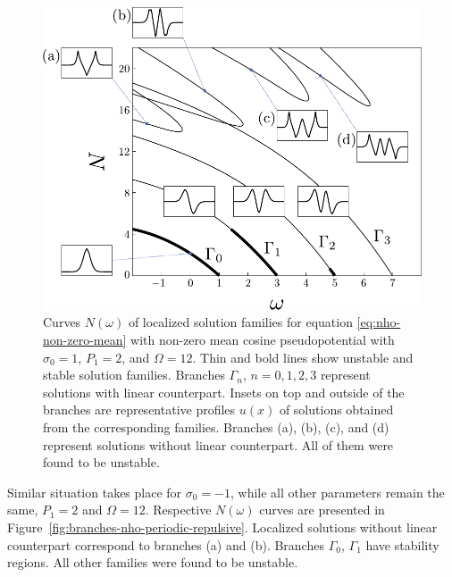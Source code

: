 \begin{figure}[h]
\centering
	\includegraphics[scale = 1]{pic/branches for cosine nho, case (a)}
	\caption{
		Curves $N(\omega)$ of localized solution families for equation \eqref{eq:nho-non-zero-mean} with non-zero mean cosine pseudopotential with $\sigma_0 = 1$, $P_1 = 2$, and $\Omega = 12$.
		Thin and bold lines show unstable and stable solution families.
		Branches $\Gamma_n$, $n = 0, 1, 2, 3$ represent solutions with linear counterpart.
		Insets on top and outside of the branches are representative profiles $u(x)$ of solutions obtained from the corresponding families.
		Branches (a), (b), (c), and (d) represent solutions without linear counterpart.
		All of them were found to be unstable.
	}
\label{fig:branches-nho-periodic-attractive}
\end{figure}

Similar situation takes place for $\sigma_0 = -1$, while all other parameters remain the same, $P_1 = 2$ and $\Omega = 12$.
Respective $N(\omega)$ curves are presented in Figure~\ref{fig:branches-nho-periodic-repulsive}.
Localized solutions without linear counterpart correspond to branches (a) and (b).
Branches $\Gamma_0$, $\Gamma_1$ have stability regions.
All other families were found to be unstable.


